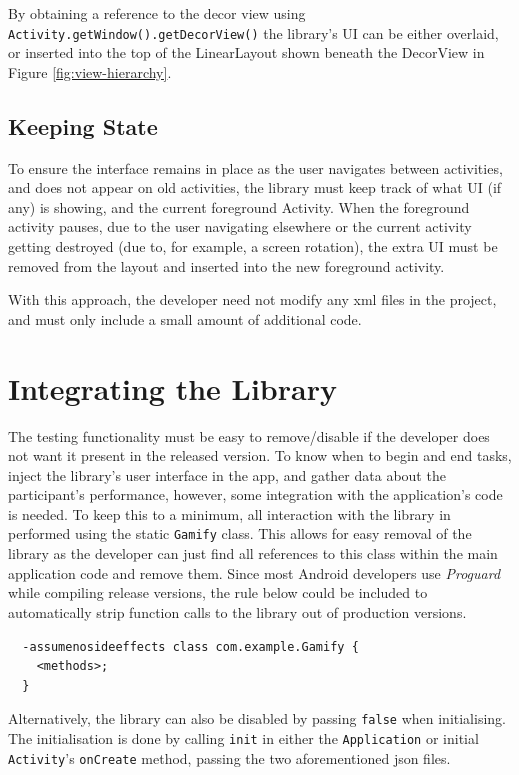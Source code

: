 By obtaining a reference to the decor view using 
\verb/Activity.getWindow().getDecorView()/ the library's UI can
be either overlaid, or inserted into the top of the LinearLayout
shown beneath the DecorView in Figure \ref{fig:view-hierarchy}.

\subsection{Keeping State}

To ensure the interface remains in place as the user navigates
between activities, and does not appear on old activities, the
library must keep track of what UI (if any) is showing, and 
the current foreground Activity. When the foreground activity
pauses, due to the user navigating elsewhere or the current
activity getting destroyed (due to, for example, a screen
rotation), the extra UI must be removed from the layout and 
inserted into the new foreground activity.

With this approach, the developer need not modify any xml files
in the project, and must only include a small amount of additional
code.

\section{Integrating the Library}

The testing functionality must be easy to remove/disable if the
developer does not want it present in the released version. To know
when to begin and end tasks, inject the library's user interface
in the app, and gather data about the participant's performance,
however, some integration with the application's code is needed.
To keep this to a minimum, all interaction with the library in
performed using the static \verb/Gamify/ class. This allows for
easy removal of the library as the developer can just find all
references to this class within the main application code and remove
them. Since most Android developers use \emph{Proguard} while
compiling release versions, the rule below could be included to
automatically strip function calls to the library out of production
versions.

\begin{verbatim}
  -assumenosideeffects class com.example.Gamify {
    <methods>;
  }
\end{verbatim}

Alternatively, the library can also be disabled by passing \verb|false|
when initialising. The initialisation is done by calling \verb|init|
in either the \verb|Application| or initial \verb|Activity|'s
\verb|onCreate| method, passing the two aforementioned json files.

